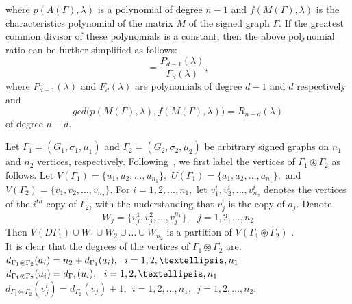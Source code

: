 \documentclass[12pt,a4paper]{article}
\theoremstyle{definition}
\theoremstyle{remark}
\begin{document}
    where $p(A(\Gamma),\lambda)$ is a polynomial of degree $n-1$ and $f(M(\Gamma),\lambda)$ is the characteristics polynomial of the matrix $M$ of the signed graph $\Gamma$. If the greatest common divisor of these polynomials is a constant, then the above polynomial ratio can be further simplified as follows: \begin{equation}\label{Equ5}
        =\frac{P_{d-1}(\lambda)}{F_d(\lambda)},
    \end{equation}
    where $P_{d-1}(\lambda)$ and $F_d(\lambda)$ are polynomials of degree $d-1$ and $d$ respectively and $$gcd\big(p(M(\Gamma),\lambda),f(M(\Gamma),\lambda)\big)=R_{n-d}(\lambda)$$
    of degree $n-d$.
    
    Let $\Gamma_1=(G_1,\sigma_1,\mu_1)$ and $\Gamma_2=(G_2,\sigma_2,\mu_2)$ be arbitrary signed graphs on $n_1$ and $n_2$ vertices, respectively. Following~\cite{gopalapillai2011spectrum}, we first label the vertices of $\Gamma_1\circledast\Gamma_2$ as follows. Let $V(\Gamma_1)=\{u_1,u_2,\ldots,u_{n_1}\},$ $U(\Gamma_1)=\{a_1,a_2,\ldots,a_{n_1}\},$ and $V(\Gamma_2)=\{v_1,v_2,\ldots,v_{n_2}\}$. For $i=1,2,\ldots,n_1,$ let $v_1 ^i,v_2 ^i,\ldots,v_{n_2} ^i$ denotes the vertices of the $i^{th}$ copy of $\Gamma_2$, with the understanding that $v_j^i$ is the copy of $a_j$. Denote
    \begin{equation} \label{eqn2}
                W_j=\big\{v_j^1,v_j^2,\ldots,v_j^{n_1}\big\}, ~~~j=1,2,\ldots,n_2
    \end{equation}
    Then $V(D\Gamma_1)\cup W_1\cup W_2\cup\ldots\cup W_{n_2}$ is a partition of $V(\Gamma_1\circledast\Gamma_2)$ .\\
    It is clear that the degrees of the vertices of $\Gamma_1\circledast\Gamma_2$ are:\\    
        $d_{\Gamma_1\circledast\Gamma_2}(a_i)=n_2+d_{\Gamma_1}(a_i), ~~i=1,2,\ldots,n_1 \\$
        $d_{\Gamma_1\circledast\Gamma_2}(u_i)=d_{\Gamma_1}(u_i), ~~i=1,2,\ldots,n_1\\$
        $d_{\Gamma_1\circledast\Gamma_2}(v^i_j)=d_{\Gamma_2}(v_j)+1, ~~i=1,2,\ldots,n_1, ~~j=1,2,\ldots,n_2.$\\
\end{document}
